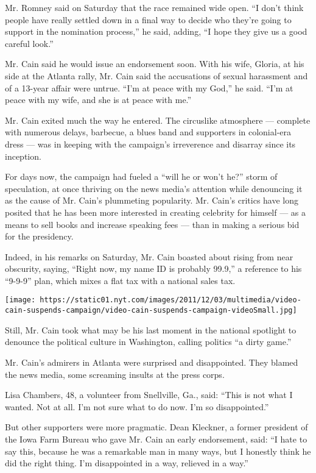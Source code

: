 Mr. Romney said on Saturday that the race remained wide open. ``I don't
think people have really settled down in a final way to decide who
they're going to support in the nomination process,'' he said, adding,
``I hope they give us a good careful look.''

Mr. Cain said he would issue an endorsement soon. With his wife, Gloria,
at his side at the Atlanta rally, Mr. Cain said the accusations of
sexual harassment and of a 13-year affair were untrue. ``I'm at peace
with my God,'' he said. ``I'm at peace with my wife, and she is at peace
with me.''

Mr. Cain exited much the way he entered. The circuslike atmosphere ---
complete with numerous delays, barbecue, a blues band and supporters in
colonial-era dress --- was in keeping with the campaign's irreverence
and disarray since its inception.

For days now, the campaign had fueled a ``will he or won't he?'' storm
of speculation, at once thriving on the news media's attention while
denouncing it as the cause of Mr. Cain's plummeting popularity. Mr.
Cain's critics have long posited that he has been more interested in
creating celebrity for himself --- as a means to sell books and increase
speaking fees --- than in making a serious bid for the presidency.

Indeed, in his remarks on Saturday, Mr. Cain boasted about rising from
near obscurity, saying, ``Right now, my name ID is probably 99.9,'' a
reference to his ``9-9-9'' plan, which mixes a flat tax with a national
sales tax.

\texttt{[image: https://static01.nyt.com/images/2011/12/03/multimedia/video-cain-suspends-campaign/video-cain-suspends-campaign-videoSmall.jpg]}

Still, Mr. Cain took what may be his last moment in the national
spotlight to denounce the political culture in Washington, calling
politics ``a dirty game.''

Mr. Cain's admirers in Atlanta were surprised and disappointed. They
blamed the news media, some screaming insults at the press corps.

Lisa Chambers, 48, a volunteer from Snellville, Ga., said: ``This is not
what I wanted. Not at all. I'm not sure what to do now. I'm so
disappointed.''

But other supporters were more pragmatic. Dean Kleckner, a former
president of the Iowa Farm Bureau who gave Mr. Cain an early
endorsement, said: ``I hate to say this, because he was a remarkable man
in many ways, but I honestly think he did the right thing. I'm
disappointed in a way, relieved in a way.''

